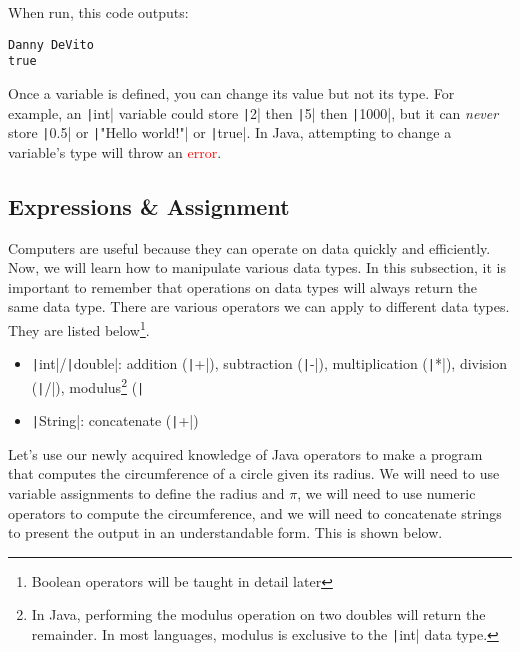 \documentclass{article}
\begin{document}
When run, this code outputs:

\small
\begin{verbatim}
Danny DeVito
true
\end{verbatim}

\normalsize
Once a variable is defined, you can change its value but not its type. For example, an \texttt|int| variable could store \texttt|2| then \texttt|5| then \texttt|1000|, but it can \emph{never} store \texttt|0.5| or \texttt|"Hello world!"| or \texttt|true|. In Java, attempting to change a variable's type will throw an \textcolor{red}{error}.

\subsection{Expressions \& Assignment}
Computers are useful because they can operate on data quickly and efficiently. Now, we will learn how to manipulate various data types. In this subsection, it is important to remember that operations on data types will always return the same data type. There are various operators we can apply to different data types. They are listed below\footnote{Boolean operators will be taught in detail later}.

\begin{itemize}
    \item \texttt|int|/\texttt|double|: addition (\texttt|+|), subtraction (\texttt|-|), multiplication (\texttt|*|), division (\texttt|/|), modulus\footnote{In Java, performing the modulus operation on two doubles will return the remainder. In most languages, modulus is exclusive to the \texttt|int| data type.} (\texttt|%

    \item \textcolor{BorlandBlue}{\texttt|String|}: concatenate (\texttt|+|)
\end{itemize}

Let's use our newly acquired knowledge of Java operators to make a program that computes the circumference of a circle given its radius. We will need to use variable assignments to define the radius and $\pi$, we will need to use numeric operators to compute the circumference, and we will need to concatenate strings to present the output in an understandable form. This is shown below.
\end{document}
